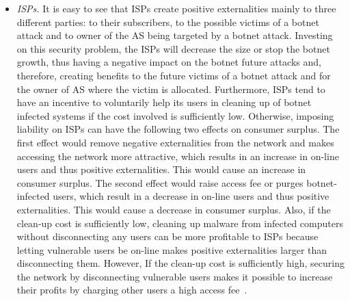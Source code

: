 \begin{itemize}
\item \textit{ISPs.} It is easy to see that ISPs create positive externalities mainly to three different parties: to their subscribers, to the possible victims of a botnet attack and to owner of the AS being targeted by a botnet attack. Investing on this security problem, the ISPs will decrease the size or stop the botnet growth, thus having a negative impact on the botnet future attacks and, therefore, creating benefits to the future victims of a botnet attack and for the owner of AS where the victim is allocated. Furthermore, ISPs tend to have an incentive to voluntarily help its users in cleaning up of botnet infected systems if the cost involved is sufficiently low. Otherwise, imposing liability on ISPs can have the following two effects on consumer surplus. The first effect would remove negative externalities from the network and makes accessing the network more attractive, which results in an increase in on-line users and thus positive externalities. This would cause an increase in consumer surplus. The second effect would raise access fee or purges botnet-infected users, which result in a decrease in on-line users and thus positive externalities. This would cause a decrease in consumer surplus. Also, if the clean-up cost is sufficiently low, cleaning up malware from infected computers without disconnecting any users can be more profitable to ISPs because letting vulnerable users be on-line makes positive externalities larger than disconnecting them. However, If the clean-up cost is sufficiently high, securing the network by disconnecting vulnerable users makes it possible to increase their profits by charging other users a high access fee~\cite{kinukawa2012should}.




\end{itemize}
